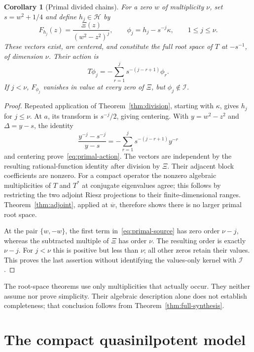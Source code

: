 \documentclass[11pt,a4paper]{article}
\numberwithin{equation}{section}
\newtheorem{corollary}[theorem]{Corollary}
\theoremstyle{definition}
\theoremstyle{remark}
\newcommand{\Hh}{\mathcal H}
\newcommand{\Ii}{\mathcal I}
\begin{document}
\begin{corollary}[Primal divided chains]\label{cor:primal}
For a zero $w$ of multiplicity $\nu$, set $s=w^2+1/4$ and define $h_j\in\Hh$ by
\begin{equation}\label{eq:primal-source}
 F_{h_j}(z)=\frac{\Xi(z)}{(w^2-z^2)^j},\qquad
 \phi_j=h_j-s^{-j}\kappa,\qquad 1\le j\le\nu.
\end{equation}
These vectors exist, are centered, and constitute the full root space of $T$ at $-s^{-1}$, of dimension $\nu$. Their action is
\begin{equation}\label{eq:primal-action}
 T\phi_j=-\sum_{r=1}^j s^{-(j-r+1)}\phi_r.
\end{equation}
If $j<\nu$, $F_{\phi_j}$ vanishes in value at every zero of $\Xi$, but $\phi_j\notin\Ii$.
\end{corollary}
\begin{proof}
Repeated application of Theorem~\ref{thm:division}, starting with $\kappa$, gives $h_j$ for $j\le\nu$. At $a$, its transform is $s^{-j}/2$, giving centering. With $y=w^2-z^2$ and $\Delta=y-s$, the identity
\[
 \frac{y^{-j}-s^{-j}}{y-s}
 =-\sum_{r=1}^j s^{-(j-r+1)}y^{-r}
\]
and centering prove~\eqref{eq:primal-action}. The vectors are independent by the resulting rational-function identity after division by $\Xi$. Their adjacent block coefficients are nonzero. For a compact operator the nonzero algebraic multiplicities of $T$ and $T^*$ at conjugate eigenvalues agree; this follows by restricting the two adjoint Riesz projections to their finite-dimensional ranges. Theorem~\ref{thm:adjoint}, applied at $\overline w$, therefore shows there is no larger primal root space.

At the pair $\{w,-w\}$, the first term in~\eqref{eq:primal-source} has zero order $\nu-j$, whereas the subtracted multiple of $\Xi$ has order $\nu$. The resulting order is exactly $\nu-j$. For $j<\nu$ this is positive but less than $\nu$; all other zeros retain their values. This proves the last assertion without identifying the values-only kernel with $\Ii$.
\end{proof}

The root-space theorems use only multiplicities that actually occur. They neither assume nor prove simplicity. Their algebraic description alone does not establish completeness; that conclusion follows from Theorem~\ref{thm:full-synthesis}.

\section{The compact quasinilpotent model}\label{sec:gap}
\end{document}
